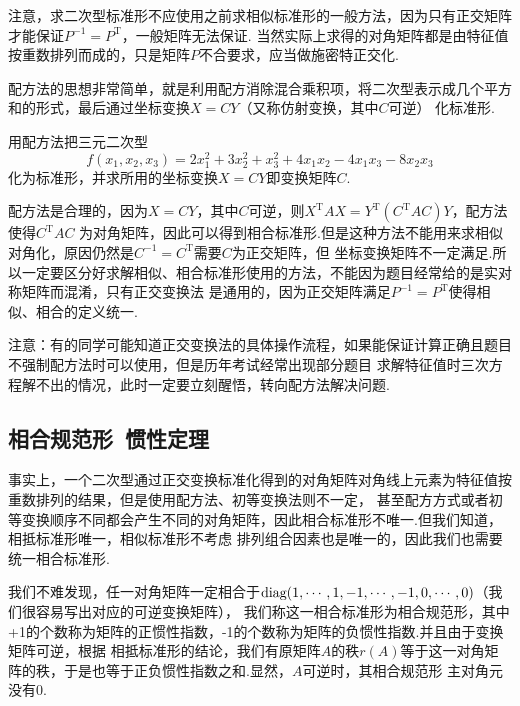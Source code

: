 注意，求二次型标准形不应使用之前求相似标准形的一般方法，因为只有正交矩阵才能保证$P^{-1}=P^\mathrm{T}$，一般矩阵无法保证.
当然实际上求得的对角矩阵都是由特征值按重数排列而成的，只是矩阵$P$不合要求，应当做施密特正交化.

配方法的思想非常简单，就是利用配方消除混合乘积项，将二次型表示成几个平方和的形式，最后通过坐标变换$X=CY$（又称仿射变换，其中$C$可逆）
化标准形.
\begin{example}
	用配方法把三元二次型
	$$f(x_1,x_2,x_3)=2x_1^2+3x_2^2+x_3^2+4x_1x_2-4x_1x_3-8x_2x_3$$
	化为标准形，并求所用的坐标变换$X=CY$即变换矩阵$C$.
\end{example}
配方法是合理的，因为$X=CY$，其中$C$可逆，则$X^\mathrm{T}AX=Y^\mathrm{T}(C^\mathrm{T}AC)Y$，配方法使得$C^\mathrm{T}AC$
为对角矩阵，因此可以得到相合标准形.但是这种方法不能用来求相似对角化，原因仍然是$C^{-1}=C^\mathrm{T}$需要$C$为正交矩阵，但
坐标变换矩阵不一定满足.所以一定要区分好求解相似、相合标准形使用的方法，不能因为题目经常给的是实对称矩阵而混淆，只有正交变换法
是通用的，因为正交矩阵满足$P^{-1}=P^\mathrm{T}$使得相似、相合的定义统一.

注意：有的同学可能知道正交变换法的具体操作流程，如果能保证计算正确且题目不强制配方法时可以使用，但是历年考试经常出现部分题目
求解特征值时三次方程解不出的情况，此时一定要立刻醒悟，转向配方法解决问题.

\subsection{相合规范形\ 惯性定理}
事实上，一个二次型通过正交变换标准化得到的对角矩阵对角线上元素为特征值按重数排列的结果，但是使用配方法、初等变换法则不一定，
甚至配方方式或者初等变换顺序不同都会产生不同的对角矩阵，因此相合标准形不唯一.但我们知道，相抵标准形唯一，相似标准形不考虑
排列组合因素也是唯一的，因此我们也需要统一相合标准形.

我们不难发现，任一对角矩阵一定相合于$\textup{diag}(1,\cdots,1,-1,\cdots,-1,0,\cdots,0)$（我们很容易写出对应的可逆变换矩阵），
我们称这一相合标准形为相合规范形，其中+1的个数称为矩阵的正惯性指数，-1的个数称为矩阵的负惯性指数.并且由于变换矩阵可逆，根据
相抵标准形的结论，我们有原矩阵$A$的秩$r(A)$等于这一对角矩阵的秩，于是也等于正负惯性指数之和.显然，$A$可逆时，其相合规范形
主对角元没有0.

